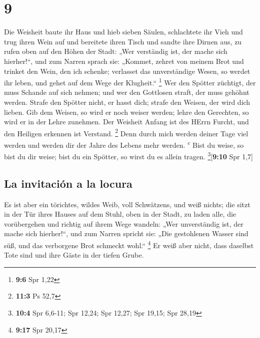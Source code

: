 \hypertarget{section-8}{%
\section{9}\label{section-8}}

 Die Weisheit baute ihr Haus und hieb sieben Säulen,
 schlachtete ihr Vieh und trug ihren Wein auf und
bereitete ihren Tisch  und sandte ihre Dirnen aus, zu
rufen oben auf den Höhen der Stadt:  „Wer verständig ist,
der mache sich hierher!{}``, und zum Narren sprach sie: 
„Kommet, zehret von meinem Brot und trinket den Wein, den ich schenke;
 verlasset das unverständige Wesen, so werdet ihr leben,
und gehet auf dem Wege der Klugheit.`` \footnote{\textbf{9:6} Spr 1,22}
 Wer den Spötter züchtigt, der muss Schande auf sich
nehmen; und wer den Gottlosen straft, der muss gehöhnt werden.
 Strafe den Spötter nicht, er hasst dich; strafe den
Weisen, der wird dich lieben.  Gib dem Weisen, so wird er
noch weiser werden; lehre den Gerechten, so wird er in der Lehre
zunehmen.  Der Weisheit Anfang ist des HErrn Furcht, und
den Heiligen erkennen ist Verstand. \footnote{\textbf{11:3} Ps 52,7}
 Denn durch mich werden deiner Tage viel werden und
werden dir der Jahre des Lebens mehr werden. \textsuperscript{c}
 Bist du weise, so bist du dir weise; bist du ein
Spötter, so wirst du es allein tragen. \footnote{\textbf{10:4} Spr
  6,6-11; Spr 12,24; Spr 12,27; Spr 19,15; Spr 28,19}{[}\textbf{9:10}
Spr 1,7{]}

\hypertarget{la-invitaciuxf3n-a-la-locura}{%
\subsection{La invitación a la
locura}\label{la-invitaciuxf3n-a-la-locura}}

 Es ist aber ein törichtes, wildes Weib, voll Schwätzens,
und weiß nichts;  die sitzt in der Tür ihres Hauses auf
dem Stuhl, oben in der Stadt,  zu laden alle, die
vorübergehen und richtig auf ihrem Wege wandeln:  „Wer
unverständig ist, der mache sich hierher!{}``, und zum Narren spricht
sie:  „Die gestohlenen Wasser sind süß, und das
verborgene Brot schmeckt wohl.`` \footnote{\textbf{9:17} Spr 20,17}
 Er weiß aber nicht, dass daselbst Tote sind und ihre
Gäste in der tiefen Grube.

